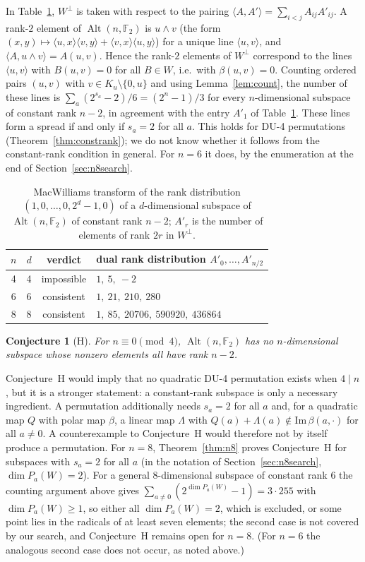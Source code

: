 \documentclass[11pt]{article}
\newtheorem{conjecture}[theorem]{Conjecture}
\theoremstyle{definition}
\newcommand{\F}{\mathbb{F}}
\DeclareMathOperator{\Alt}{Alt}
\begin{document}
In Table~\ref{tab:macw}, $W^\perp$ is taken with respect to the pairing $\langle A,A'\rangle=\sum_{i<j}A_{ij}A'_{ij}$.
A rank-$2$ element of $\Alt(n,\F_2)$ is $u\wedge v$ (the form
$(x,y)\mapsto\langle u,x\rangle\langle v,y\rangle+\langle v,x\rangle\langle u,y\rangle$) for a
unique line $\langle u,v\rangle$, and $\langle A,u\wedge v\rangle=A(u,v)$. Hence the rank-$2$
elements of $W^\perp$ correspond to the lines $\langle u,v\rangle$ with $B(u,v)=0$ for all
$B\in W$, i.e.\ with $\beta(u,v)=0$. Counting ordered pairs $(u,v)$ with $v\in
K_u\setminus\{0,u\}$ and using Lemma~\ref{lem:count}, the number of these lines is
$\sum_a(2^{s_a}-2)/6=(2^n-1)/3$ for every $n$-dimensional subspace of constant rank $n-2$, in
agreement with the
entry $A'_1$ of Table~\ref{tab:macw}. These lines form a spread if and only if $s_a=2$ for all
$a$. This holds for DU-4 permutations (Theorem~\ref{thm:constrank}); we do not know whether it
follows from the constant-rank condition in general. For $n=6$ it does, by the enumeration at
the end of Section~\ref{sec:n8search}.
\begin{table}[h]\centering
\begin{tabular}{cccl}\toprule
$n$ & $d$ & verdict & dual rank distribution $A'_0,\dots,A'_{n/2}$\\\midrule
4 & 4 & impossible & $1,\ 5,\ -2$\\
6 & 6 & consistent & $1,\ 21,\ 210,\ 280$\\
8 & 8 & consistent & $1,\ 85,\ 20706,\ 590920,\ 436864$\\\bottomrule
\end{tabular}
\caption{MacWilliams transform of the rank distribution $(1,0,\dots,0,2^d-1,0)$ of a
$d$-dimensional subspace of $\Alt(n,\F_2)$ of constant rank $n-2$; $A'_r$ is the number of
elements of rank $2r$ in $W^\perp$.}
\label{tab:macw}
\end{table}
\begin{conjecture}[H]
For $n\equiv 0\pmod 4$, $\Alt(n,\F_2)$ has no $n$-dimensional subspace whose nonzero
elements all have rank $n-2$.
\end{conjecture}
Conjecture~H would imply that no quadratic DU-4 permutation exists when $4\mid n$, but it is a
stronger statement: a constant-rank subspace is only a necessary ingredient. A permutation
additionally needs $s_a=2$ for all $a$ and, for a quadratic map $Q$ with polar map $\beta$, a
linear map $\Lambda$ with $Q(a)+\Lambda(a)\notin\mathrm{Im}\,\beta(a,\cdot)$ for all $a\neq 0$. A
counterexample to Conjecture~H would therefore not by itself produce a permutation.
For $n=8$, Theorem~\ref{thm:n8} proves Conjecture~H for subspaces with $s_a=2$ for all $a$
(in the notation of Section~\ref{sec:n8search}, $\dim P_a(W)=2$). For a general $8$-dimensional
subspace of constant rank $6$ the counting argument above gives
$\sum_{a\neq0}(2^{\dim P_a(W)}-1)=3\cdot255$ with $\dim P_a(W)\ge1$, so either all
$\dim P_a(W)=2$, which is excluded, or some point lies in the radicals of at least seven
elements; the second case is not covered by our search, and Conjecture~H remains open for
$n=8$. (For $n=6$ the analogous second case does not occur, as noted above.)
\end{document}
